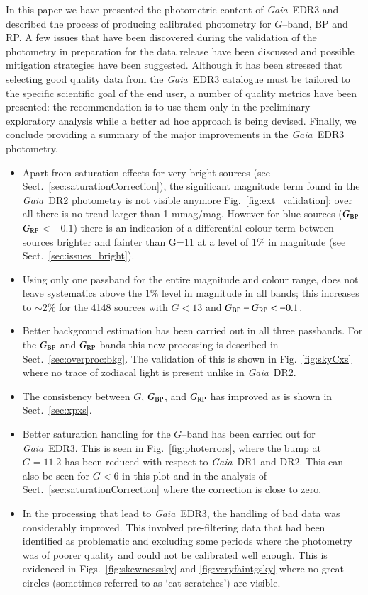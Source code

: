 \documentclass{aa}
\newcommand{\gaia}{\textit{Gaia}\xspace}
\newcommand{\gband}{$G$--band\xspace}
\newcommand{\gbp}{\ensuremath{G_{\rm BP}}\xspace}
\newcommand{\grp}{\ensuremath{G_{\rm RP}}\xspace}
\newcommand{\dro}{\gaia~DR1\xspace}
\newcommand{\drt}{\gaia~DR2\xspace}
\newcommand{\edr}{\gaia~EDR3\xspace}
\newcommand{\secname}{Sect.}
\newcommand{\secref}[1]{\secname~\ref{sec:#1}}
\newcommand{\figref}[1]{Fig.~\ref{fig:#1}}
\begin{document}
In this paper we have presented the photometric content of \edr and described the process of producing calibrated photometry for \gband, BP and RP. A few issues that have been discovered during the validation of the photometry in preparation for the data release have been discussed and possible mitigation strategies have been suggested. Although it has been stressed that selecting good quality data from the \edr catalogue must be tailored to the specific scientific goal of the end user, a number of quality metrics have been presented: the recommendation is to use them only in the preliminary exploratory analysis while a better ad hoc approach is being devised.
Finally, we conclude providing a summary of the major improvements in the \edr photometry.
%
\begin{itemize}
    \item Apart from saturation effects for very bright sources (see \secref{saturationCorrection}), the significant magnitude term found in the \drt photometry \citep{CasagrandeVandenBerg, Weiler2017} is not visible anymore \figref{ext_validation}: over all there is no trend larger than 1 mmag/mag. 
    However for blue sources (\gbp-\grp $<-0.1$) there is an indication of a differential colour term between sources brighter and fainter than G=11 at a level of $1\%$ in magnitude (see \secref{issues_bright}).
    \item Using only one passband for the entire magnitude and colour range, does not leave systematics above the $1\%$ level in magnitude in all bands; this increases to $\sim2\%$ for the 4148 sources with $G<13$ and $\gbp-\grp<-0.1$.
    \item Better background estimation has been carried out in all three passbands. For the \gbp and \grp bands this new processing is described in \secref{overproc:bkg}. The validation of this is shown in \figref{skyCxs} where no trace of zodiacal light is present unlike in \drt.
    \item The consistency between $G$, \gbp, and \grp has improved as is shown in \secref{xpxs}.
    \item Better saturation handling for the \gband has been carried out for \edr. This is seen in \figref{photerrors}, where the bump at $G=11.2$ has been reduced with respect to \dro and DR2. This can also be seen for $G<6$ in this plot and in the analysis of \secref{saturationCorrection} where the correction is close to zero.
    \item In the processing that lead to \edr, the handling of bad data was considerably improved. This involved pre-filtering data that had been identified as problematic and excluding some periods where the photometry was of poorer quality and could not be calibrated well enough. This is evidenced in Figs.~\ref{fig:skewnesssky} and \ref{fig:veryfaintgsky} where no great circles (sometimes referred to as `cat scratches') are visible.

\end{itemize}
\end{document}
